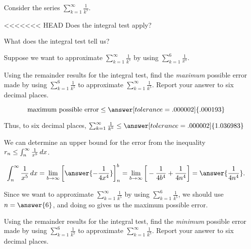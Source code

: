 \documentclass{ximera}
\author{Jim Talamo}
\begin{document}
\begin{exercise}

Consider the series $\sum_{k=1}^{\infty} \frac{1}{k^5}$.  

<<<<<<< HEAD
Does the integral test apply?

\begin{multipleChoice}
\end{multipleChoice}

What does the integral test tell us?
\begin{multipleChoice}
\end{multipleChoice}

Suppose we want to approximate $\sum_{k=1}^{\infty} \frac{1}{k^5}$ by using $\sum_{k=1}^{6} \frac{1}{x^5}$.  

\begin{exercise}
Using the remainder results for the integral test, find the \emph{maximum} possible error made by using $\sum_{k=1}^{6} \frac{1}{k^5}$ to approximate $\sum_{k=1}^{\infty} \frac{1}{k^5}$.  Report your answer to six decimal places.

\[
\textrm{maximum possible error} \leq \answer[tolerance=.000002]{.000193}
\]


Thus, to six decimal places, $\sum_{k=1}^{\infty} \frac{1}{k^5} \leq \answer[tolerance=.000002]{1.036983}$

\begin{hint}
We can determine an upper bound for the error from the inequality $ r_n \leq \int_{n}^{\infty} \frac{1}{x^5} \mathop{}\!d x$. 

\[
\int_n^\infty \frac{1}{x^5} \d x = \lim_{b \to \infty} \eval{\answer{-\frac{1}{4x^4}}}_n^b = \lim_{b \to \infty} \eval{-\frac{1}{4b^4}+\frac{1}{4n^4}} =\answer{\frac{1}{4n^4}}. 
\]

Since we want to approximate $\sum_{k=1}^{\infty} \frac{1}{k^5}$ by using $\sum_{k=1}^{6} \frac{1}{k^5}$, we should use $n=\answer{6}$, and doing so gives us the maximum possible error.
\end{hint}
\end{exercise}

\begin{exercise}
Using the remainder results for the integral test, find the \emph{minimum} possible error made by using $\sum_{k=1}^{6} \frac{1}{k^5}$ to approximate $\sum_{k=1}^{\infty} \frac{1}{k^5}$.  Report your answer to six decimal places.


\end{exercise}
\end{exercise}
\end{document}
